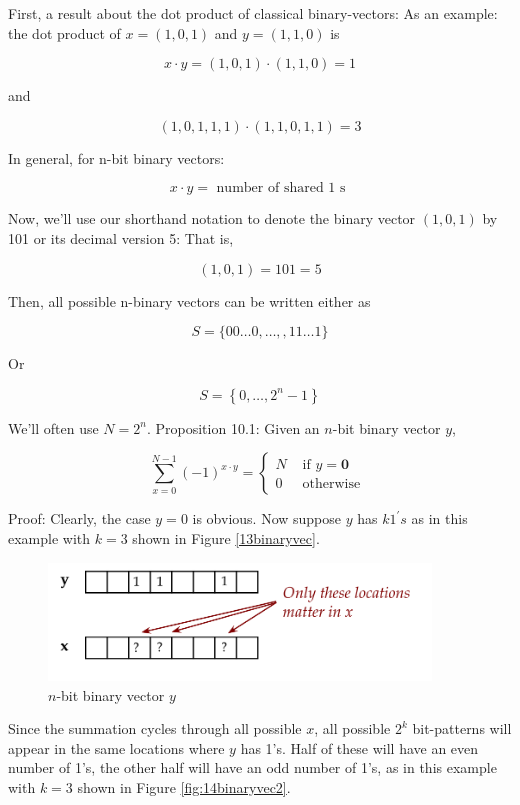 \documentclass[main.tex]{subfiles}
\begin{document}
    First, a result about the dot product of classical binary-vectors: As an example: the dot product of $x=(1,0,1)$ and $y=(1,1,0)$ is
    
    $$
    x \cdot y=(1,0,1) \cdot(1,1,0)=1
    $$
    
    and
    
    $$
    (1,0,1,1,1) \cdot(1,1,0,1,1)=3
    $$
    
    In general, for n-bit binary vectors:
    
    $$
    x \cdot y=\text { number of shared } 1 \text { s }
    $$
    
    Now, we'll use our shorthand notation to denote the binary vector $(1,0,1)$ by 101 or its decimal version 5: That is,
    
    $$
    (1,0,1)=101=5
    $$
    
    Then, all possible n-binary vectors can be written either as
    
    $$
    S=\{00 \ldots 0, \ldots,, 11 \ldots 1\}
    $$
    
    Or
    
    $$
    S=\left\{0, \ldots, 2^{n}-1\right\}
    $$
    
    We'll often use $N=2^{n}$. Proposition 10.1: Given an $n$-bit binary vector $y$,
    
    $$
    \sum_{x=0}^{N-1}(-1)^{x \cdot y}=\left\{\begin{array}{cc}
    N & \text { if } y=\mathbf{0} \\
    0 & \text { otherwise }
    \end{array}\right.
    $$
    
    Proof: Clearly, the case $y=0$ is obvious. Now suppose $y$ has $k 1^{\prime} s$ as in this example with $k=3$ shown in Figure \ref{13binaryvec}.
    
    \begin{figure}
        \centering
        \includegraphics[width=4in]{notes/figs/n11/13binaryvec.png}
            \caption{$n$-bit binary vector $y$}
        \label{fig:13binaryvec}
    \end{figure}
    
    Since the summation cycles through all possible $x$, all possible $2^{k}$ bit-patterns will appear in the same locations where $y$ has 1's. Half of these will have an even number of 1's, the other half will have an odd number of 1's, as in this example with $k=3$ shown in Figure \ref{fig:14binaryvec2}.
    
\end{document}
